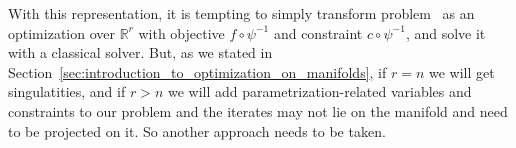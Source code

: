 With this representation, it is tempting to simply transform problem~ as an optimization over $\mathbb{R}^r$ with objective $f \circ \psi^{-1}$ and constraint $c \circ \psi^{-1}$, and solve it with a classical solver.
But, as we stated in Section~\ref{sec:introduction_to_optimization_on_manifolds}, if $r=n$ we will get singulatities, and if $r>n$ we will add parametrization-related variables and constraints to our problem and the iterates may not lie on the manifold and need to be projected on it.
So another approach needs to be taken.



